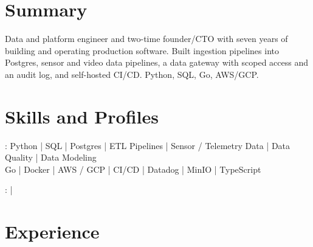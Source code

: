 \documentclass[print]{jack-resume}
\begin{document}
\pagecolor{darkmodeBackground}


\begin{minipage}[t][1cm][t]{.03\textwidth}
    \hfill
\end{minipage}

\section{Summary}
Data and platform engineer and two-time founder/CTO with seven years of building and operating production software. Built ingestion pipelines into Postgres, sensor and video data pipelines, a data gateway with scoped access and an audit log, and self-hosted CI/CD. Python, SQL, Go, AWS/GCP.
\sectionsep

\section{Skills and Profiles}
:
Python \hfill | \hfill
SQL \hfill | \hfill
Postgres \hfill | \hfill
ETL Pipelines \hfill | \hfill
Sensor / Telemetry Data \hfill | \hfill
Data Quality \hfill | \hfill
Data Modeling \\
\hspace{1.0cm} Go \hfill | \hfill
Docker \hfill | \hfill
AWS / GCP \hfill | \hfill
CI/CD \hfill | \hfill
Datadog \hfill | \hfill
MinIO \hfill | \hfill
TypeScript \\

\raggedright{
    :
      \href{https://www.linkedin.com/in/jack-sturtevant/}{ \ExternalLink} |
     \href{https://github.com/jacksturt}{ \ExternalLink}}

\section{Experience}
\end{document}
